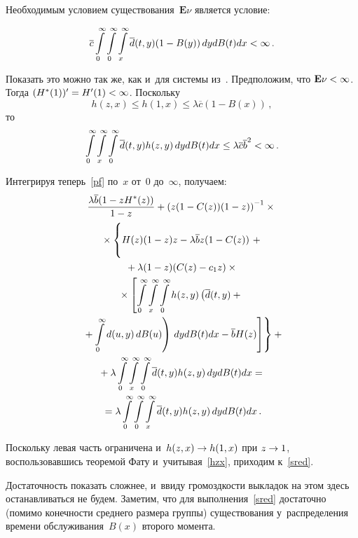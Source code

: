 \begin{multicols}{2}
Необходимым условием существования~$\mathbf{E}\nu$ является условие:

\pagebreak



\noindent
\begin{equation}
\label{sred}
\overline{c}
\int\limits_0^\infty
\int\limits_0^\infty
\int\limits_x^\infty
\overline d(t,y)
(1-B(y)) \,dy  dB(t)
dx < \infty\,.
\end{equation}


\noindent Показать это можно так же, как и~для системы из~\cite{n3}.
Предположим, что $\mathbf{E}\nu\hm< \infty$. Тогда $(H^*(1))'\hm=H'(1)<\infty$.
Поскольку
\begin{equation}
\label{hzx}
h(z,x)\le h(1,x)\le \lambda \overline{c} (1-B(x)) \,,
\end{equation}
то
$$
\int\limits_0^\infty
\int\limits_x^\infty
\int\limits_0^\infty
\overline d(t,y) h(z,y) \, dy 
dB(t) dx
\le \lambda  \overline{c}  \overline{b}^2 < \infty\,.
$$

\noindent Интегрируя теперь~\eqref{pf} по~$x$ от~0 до~$\infty$,
получаем:
\begin{multline*}
\displaystyle\frac{\displaystyle  \lambda \overline{b} (1-z H^*(z))\mathstrut}{\displaystyle  1-z\mathstrut}+
\left ( z(1-C(z))(1-z) \right )^{-1}\times{}\\
{}\times \left \{
\vphantom{\int\limits_0^\infty}
H(z)(1-z)z - \lambda \overline{b} z (1-C(z))
\right.
+{}
\\
{}+
\lambda(1-z) (C(z)-c_1 z)\times{}\\
{}\times
\left[
\int\limits_0^\infty
\int\limits_x^\infty
\int\limits_0^\infty
h(z,y) \left(
\overline d(t,y) + {}\right.\right.\\
\left.\left.\left.{}+\int\limits_0^\infty d(u,y) \, dB(u)
\right)\,
dy  dB(t)
dx -
\overline{b} H(z)
\right ] \right\}
+ {}\\
{}+ \lambda \int\limits_0^\infty
\int\limits_x^\infty \int\limits_0^\infty
\overline d(t,y) h(z,y) \,dy dB(t) dx
={}\\
{}= \lambda \int\limits_0^\infty \int\limits_0^\infty
\int\limits_x^\infty \overline d(t,y) h(z,y) \,dy  dB(t) dx\,.
\end{multline*}

\noindent Поскольку левая часть ограничена и~$h(z,x) \hm\rightarrow h(1,x)$ 
при $z \hm\rightarrow 1$,
воспользовавшись теоремой Фату и~учитывая~\eqref{hzx}, приходим к~\eqref{sred}.

Достаточность показать сложнее, 
и~ввиду громоздкости выкладок на этом здесь останавливаться не будем.
Заметим, что для выполнения~\eqref{sred} достаточно (помимо конечности среднего
размера группы) существования у~распределения времени обслуживания~$B(x)$ 
второго момента.


\end{multicols}
